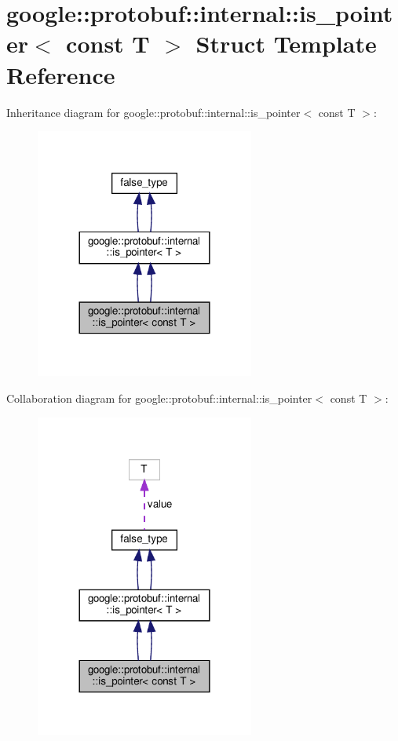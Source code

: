 \hypertarget{structgoogle_1_1protobuf_1_1internal_1_1is__pointer_3_01const_01T_01_4}{}\section{google\+:\+:protobuf\+:\+:internal\+:\+:is\+\_\+pointer$<$ const T $>$ Struct Template Reference}
\label{structgoogle_1_1protobuf_1_1internal_1_1is__pointer_3_01const_01T_01_4}


Inheritance diagram for google\+:\+:protobuf\+:\+:internal\+:\+:is\+\_\+pointer$<$ const T $>$\+:
\nopagebreak
\begin{figure}[H]
\begin{center}
\leavevmode
\includegraphics[width=204pt]{structgoogle_1_1protobuf_1_1internal_1_1is__pointer_3_01const_01T_01_4__inherit__graph}
\end{center}
\end{figure}


Collaboration diagram for google\+:\+:protobuf\+:\+:internal\+:\+:is\+\_\+pointer$<$ const T $>$\+:
\nopagebreak
\begin{figure}[H]
\begin{center}
\leavevmode
\includegraphics[width=204pt]{structgoogle_1_1protobuf_1_1internal_1_1is__pointer_3_01const_01T_01_4__coll__graph}
\end{center}
\end{figure}
